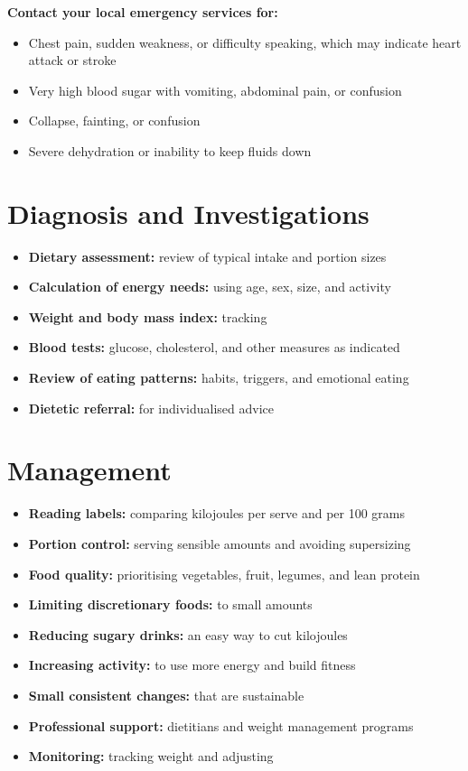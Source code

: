 \textbf{Contact your local emergency services for:}
\begin{itemize}
    \item Chest pain, sudden weakness, or difficulty speaking, which may indicate heart attack or stroke
    \item Very high blood sugar with vomiting, abdominal pain, or confusion
    \item Collapse, fainting, or confusion
    \item Severe dehydration or inability to keep fluids down
\end{itemize}

\section*{Diagnosis and Investigations}
\begin{itemize}
    \item \textbf{Dietary assessment:} review of typical intake and portion sizes
    \item \textbf{Calculation of energy needs:} using age, sex, size, and activity
    \item \textbf{Weight and body mass index:} tracking
    \item \textbf{Blood tests:} glucose, cholesterol, and other measures as indicated
    \item \textbf{Review of eating patterns:} habits, triggers, and emotional eating
    \item \textbf{Dietetic referral:} for individualised advice
\end{itemize}

\section*{Management}
\begin{itemize}
    \item \textbf{Reading labels:} comparing kilojoules per serve and per 100 grams
    \item \textbf{Portion control:} serving sensible amounts and avoiding supersizing
    \item \textbf{Food quality:} prioritising vegetables, fruit, legumes, and lean protein
    \item \textbf{Limiting discretionary foods:} to small amounts
    \item \textbf{Reducing sugary drinks:} an easy way to cut kilojoules
    \item \textbf{Increasing activity:} to use more energy and build fitness
    \item \textbf{Small consistent changes:} that are sustainable
    \item \textbf{Professional support:} dietitians and weight management programs
    \item \textbf{Monitoring:} tracking weight and adjusting
\end{itemize}

